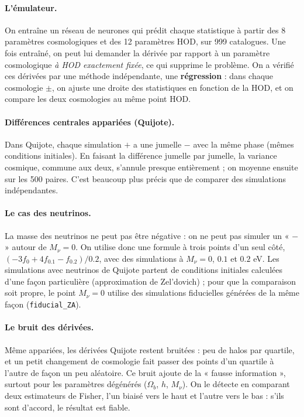 \documentclass[11pt]{article}
\begin{document}
\paragraph{L'émulateur.} On entraîne un réseau de neurones qui prédit chaque statistique à partir des 8 paramètres cosmologiques et des 12 paramètres HOD, sur 999 catalogues. Une fois entraîné, on peut lui demander la dérivée par rapport à un paramètre cosmologique \emph{à HOD exactement fixée}, ce qui supprime le problème. On a vérifié ces dérivées par une méthode indépendante, une \textbf{régression} : dans chaque cosmologie $\pm$, on ajuste une droite des statistiques en fonction de la HOD, et on compare les deux cosmologies au même point HOD.

\paragraph{Différences centrales appariées (Quijote).} Dans Quijote, chaque simulation $+$ a une jumelle $-$ avec la même phase (mêmes conditions initiales). En faisant la différence jumelle par jumelle, la variance cosmique, commune aux deux, s'annule presque entièrement ; on moyenne ensuite sur les 500 paires. C'est beaucoup plus précis que de comparer des simulations indépendantes.

\paragraph{Le cas des neutrinos.} La masse des neutrinos ne peut pas être négative : on ne peut pas simuler un « $-$ » autour de $M_\nu=0$. On utilise donc une formule à trois points d'un seul côté, $(-3f_0+4f_{0.1}-f_{0.2})/0.2$, avec des simulations à $M_\nu=0$, $0.1$ et $0.2$ eV. Les simulations avec neutrinos de Quijote partent de conditions initiales calculées d'une façon particulière (approximation de Zel'dovich) ; pour que la comparaison soit propre, le point $M_\nu=0$ utilise des simulations fiducielles générées de la même façon (\texttt{fiducial\_ZA}).

\paragraph{Le bruit des dérivées.} Même appariées, les dérivées Quijote restent bruitées : peu de halos par quartile, et un petit changement de cosmologie fait passer des points d'un quartile à l'autre de façon un peu aléatoire. Ce bruit ajoute de la « fausse information », surtout pour les paramètres dégénérés ($\Omega_b$, $h$, $M_\nu$). On le détecte en comparant deux estimateurs de Fisher, l'un biaisé vers le haut et l'autre vers le bas : s'ils sont d'accord, le résultat est fiable.
\end{document}
